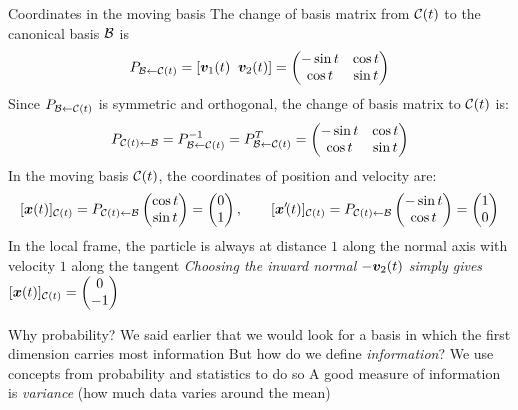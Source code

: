 \documentclass[aspectratio=169]{beamer}\usepackage[]{graphicx}\usepackage[]{xcolor}
\begin{document}
\begin{frame}{Coordinates in the moving basis}
The change of basis matrix from $\mathcal{C}(t)$ to the canonical basis $\mathcal{B}$ is
\[
P_{\mathcal{B}\leftarrow\mathcal{C}(t)} = [\bm{v}_1(t) \;\; \bm{v}_2(t)] = \begin{pmatrix} -\sin t & \cos t \\ \cos t & \sin t \end{pmatrix}
\]
\vfill
Since $P_{\mathcal{B}\leftarrow\mathcal{C}(t)}$ is symmetric and orthogonal, the change of basis matrix to $\mathcal{C}(t)$ is:
\[
P_{\mathcal{C}(t)\leftarrow\mathcal{B}} = P_{\mathcal{B}\leftarrow\mathcal{C}(t)}^{-1} = P_{\mathcal{B}\leftarrow\mathcal{C}(t)}^T = \begin{pmatrix} -\sin t & \cos t \\ \cos t & \sin t \end{pmatrix}
\]
\vfill
In the moving basis $\mathcal{C}(t)$, the coordinates of position and velocity are:
\[
[\bm{x}(t)]_{\mathcal{C}(t)} = P_{\mathcal{C}(t)\leftarrow\mathcal{B}} \begin{pmatrix} \cos t \\ \sin t \end{pmatrix} = \begin{pmatrix} 0 \\ 1 \end{pmatrix}, \qquad
[\bm{x}'\!(t)]_{\mathcal{C}(t)} = P_{\mathcal{C}(t)\leftarrow\mathcal{B}} \begin{pmatrix} -\sin t \\ \cos t \end{pmatrix} = \begin{pmatrix} 1 \\ 0 \end{pmatrix}
\]
\vfill
In the local frame, the particle is always at distance $1$ along the normal axis with velocity $1$ along the tangent
\vfill
\footnotesize\emph{Choosing the inward normal $-\bm{v}_2(t)$ simply gives $[\bm{x}(t)]_{\mathcal{C}(t)} = \begin{pmatrix} 0 \\ -1 \end{pmatrix}$}
\end{frame}




\begin{frame}{Why probability?}
We said earlier that we would look for a basis in which the first dimension carries most information
\vfill
But how do we define \emph{information}?
\vfill
We use concepts from probability and statistics to do so
\vfill
A good measure of information is \emph{variance} (how much data varies around the mean)
\end{frame} 
\end{document}
